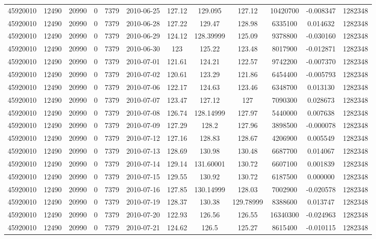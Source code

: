 \documentclass[12 pt]{article}
\begin{document}
\begin{flushleft}
\begin{table}[h]
\begin{tabular}{c c c c c c c c c c c c }
45920010 & 12490 & 20990 & 0 & 7379 & 2010-06-25 & 127.12 & 129.095 & 127.12 & 10420700 & -0.008347 & 1282348\\
45920010 & 12490 & 20990 & 0 & 7379 & 2010-06-28 & 127.22 & 129.47 & 128.98 & 6335100 & 0.014632 & 1282348\\
45920010 & 12490 & 20990 & 0 & 7379 & 2010-06-29 & 124.12 & 128.39999 & 125.09 & 9378800 & -0.030160 & 1282348\\
45920010 & 12490 & 20990 & 0 & 7379 & 2010-06-30 & 123 & 125.22 & 123.48 & 8017900 & -0.012871 & 1282348\\
45920010 & 12490 & 20990 & 0 & 7379 & 2010-07-01 & 121.61 & 124.21 & 122.57 & 9742200 & -0.007370 & 1282348\\
45920010 & 12490 & 20990 & 0 & 7379 & 2010-07-02 & 120.61 & 123.29 & 121.86 & 6454400 & -0.005793 & 1282348\\
45920010 & 12490 & 20990 & 0 & 7379 & 2010-07-06 & 122.17 & 124.63 & 123.46 & 6348700 & 0.013130 & 1282348\\
45920010 & 12490 & 20990 & 0 & 7379 & 2010-07-07 & 123.47 & 127.12 & 127 & 7090300 & 0.028673 & 1282348\\
45920010 & 12490 & 20990 & 0 & 7379 & 2010-07-08 & 126.74 & 128.14999 & 127.97 & 5440000 & 0.007638 & 1282348\\
45920010 & 12490 & 20990 & 0 & 7379 & 2010-07-09 & 127.29 & 128.2 & 127.96 & 3898500 & -0.000078 & 1282348\\
45920010 & 12490 & 20990 & 0 & 7379 & 2010-07-12 & 127.16 & 128.83 & 128.67 & 4206900 & 0.005549 & 1282348\\
45920010 & 12490 & 20990 & 0 & 7379 & 2010-07-13 & 128.69 & 130.98 & 130.48 & 6687700 & 0.014067 & 1282348\\
45920010 & 12490 & 20990 & 0 & 7379 & 2010-07-14 & 129.14 & 131.60001 & 130.72 & 6607100 & 0.001839 & 1282348\\
45920010 & 12490 & 20990 & 0 & 7379 & 2010-07-15 & 129.55 & 130.92 & 130.72 & 6187500 & 0.000000 & 1282348\\
45920010 & 12490 & 20990 & 0 & 7379 & 2010-07-16 & 127.85 & 130.14999 & 128.03 & 7002900 & -0.020578 & 1282348\\
45920010 & 12490 & 20990 & 0 & 7379 & 2010-07-19 & 128.37 & 130.38 & 129.78999 & 8388600 & 0.013747 & 1282348\\
45920010 & 12490 & 20990 & 0 & 7379 & 2010-07-20 & 122.93 & 126.56 & 126.55 & 16340300 & -0.024963 & 1282348\\
45920010 & 12490 & 20990 & 0 & 7379 & 2010-07-21 & 124.62 & 126.5 & 125.27 & 8615400 & -0.010115 & 1282348\\

\end{tabular}
\end{table}
\end{flushleft}
\end{document}
